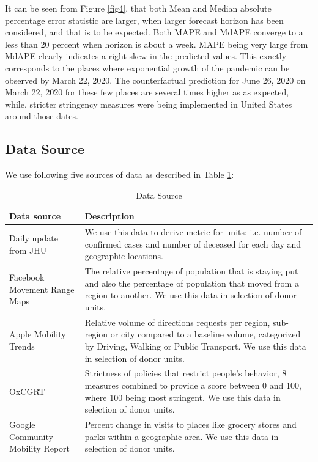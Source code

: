 \documentclass[preprint,authoryear,12pt]{elsarticle}
\begin{document}
    It can be seen from Figure \ref{fig4}, that both Mean and Median absolute percentage error statistic are larger, when larger forecast horizon has been considered, and that is to be expected. Both MAPE and MdAPE converge to a less than 20 percent when horizon is about a week. MAPE being very large from MdAPE clearly indicates a right skew in the predicted values. This exactly corresponds to the places where exponential growth of the pandemic can be observed by March 22, 2020. The counterfactual prediction for June 26, 2020 on March 22, 2020 for these few places are several times higher as as expected, while, stricter stringency measures were being implemented in United States around those dates.
    
	\subsection{Data Source}
	We use following five sources of data as described in Table \ref{Table1}:
	
	\begin{table}
		\centering
		\begin{tabularx}{0.9\textwidth}[t]{p{}X}
			\hline
			\textbf{Data source} &  \textbf{Description}\\ [0.5ex]
			\hline\hline
			Daily update from JHU  \cite{DDG2020}  & We use this data to derive metric for units: i.e. number of confirmed cases and number of deceased for each day and geographic locations.\\ [1ex]
			\hline
			Facebook Movement Range Maps \cite{JM2020} & The relative percentage of population that is staying put and also the percentage of population that moved from a region to another. We use this data in selection of donor units.\\
			\hline
			Apple Mobility Trends\cite{Apple2020} & Relative volume of directions requests per region, sub-region or city compared to a baseline volume, categorized by Driving, Walking or Public Transport. We use this data in selection of donor units.\\
			\hline
			OxCGRT  \cite{HWP2020} &  Strictness of policies that restrict people’s behavior, 8 measures combined to provide a score between 0 and 100, where 100 being most stringent. We use this data in selection of donor units.\\
			\hline
			Google Community Mobility Report \cite{Goog2020} &  Percent change in visits to places like grocery stores and parks within a geographic area. We use this data in selection of donor units.\\ [1ex] 
			\hline
		\end{tabularx}
		\caption{Data Source}
		\label{Table1}
	\end{table}
	 
\end{document}
